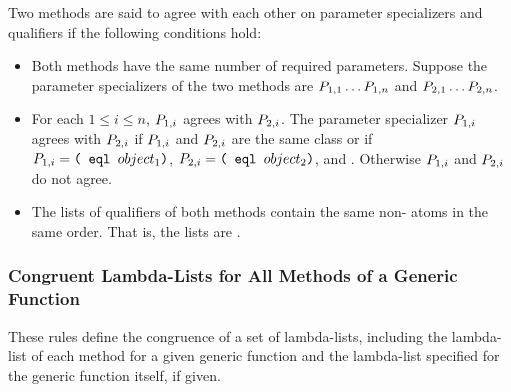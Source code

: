 Two methods are said to agree with each other on parameter specializers
and qualifiers if the following conditions hold:

\begin{itemize}

\item Both methods have the same number of required parameters.
Suppose the parameter specializers of the two methods are
$P_{1,1}\ldots P_{1,n}$
and $P_{2,1}\ldots P_{2,n}$.

\item For each $1\leq i\leq n$,
$P_{1,i}$ agrees with $P_{2,i}$.
The parameter specializer $P_{1,i}$
agrees with $P_{2,i}$ if
$P_{1,i}$ and $P_{2,i}$ are the same class or if 
$P\sub{1,i}=\texttt{(\cdf{eql} $object_1$)}$,
$P\sub{2,i}=\texttt{(\cdf{eql} $object_2$)}$, and
.
Otherwise $P_{1,i}$ and $P_{2,i}$ do not agree.


\item The lists of qualifiers of both methods contain the same 
non- atoms in the same order. That is, the lists are .

\end{itemize}


\subsubsection{Congruent Lambda-Lists for All Methods of a Generic Function}
\label{Congruent-Lambda-Lists-for-All-Methods-of-a-Generic-Function-SECTION}

These rules define the congruence of a set of lambda-lists, including the
lambda-list of each method for a given generic function and the
lambda-list specified for the generic function itself, if given.

